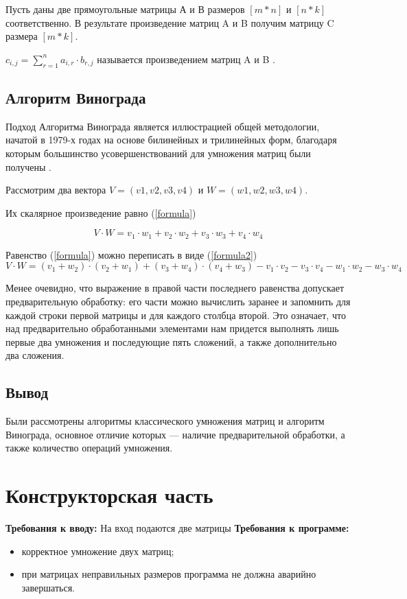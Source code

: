\documentclass[12pt]{report}
\begin{document}
Пусть даны две прямоугольные матрицы А и В размеров $[m * n]$ и $[n * k]$ соответственно.  
В результате произведение матриц A и B получим матрицу C размера $[m *  k]$.


$c_{i,j} = \sum\limits_{r=1}^n a_{i,r}\cdot b_{r,j}$ называется произведением матриц A и B \cite{Beloysov}.


\section{Алгоритм Винограда}
Подход Алгоритма Винограда является иллюстрацией общей методологии, начатой в 1979-х годах на основе
билинейных и трилинейных форм, благодаря которым большинство усовершенствований для умножения матриц были получены \cite{Gall2012}.

Рассмотрим два вектора $V = (v1, v2, v3, v4)$ и $W = (w1, w2, w3, w4)$.  

Их скалярное произведение равно (\ref{formula}) 

\begin{equation} \label{formula}
V \cdot W=v_1 \cdot w_1 + v_2 \cdot w_2 + v_3 \cdot w_3 + v_4 \cdot w_4
\end{equation}

Равенство (\ref{formula}) можно переписать в виде (\ref{formula2}) 
\begin{equation} \label{formula2}
V \cdot W=(v_1 + w_2) \cdot (v_2 + w_1) + (v_3 + w_4) \cdot (v_4 + w_3) - v_1 \cdot v_2 - v_3 \cdot v_4 - w_1 \cdot w_2 - w_3 \cdot w_4
\end{equation}

Менее очевидно, что выражение в правой части последнего равенства допускает предварительную обработку: его части можно вычислить заранее и запомнить для каждой строки первой матрицы и для каждого столбца второй. 
Это означает, что над предварительно обработанными элементами нам придется выполнять лишь первые два умножения и последующие пять сложений, а также дополнительно два сложения. 

\section{Вывод}
Были рассмотрены алгоритмы классического умножения матриц и алгоритм Винограда, основное отличие которых — наличие предварительной обработки, а также количество операций умножения.

\chapter{Конструкторская часть}
\textbf{Требования к вводу:}
На вход подаются две матрицы
\newline
\textbf{Требования к программе:}
\begin{itemize}
	\item корректное умножение двух матриц;
	\item при матрицах неправильных размеров программа не должна аварийно завершаться.
\end{itemize}
\end{document}
